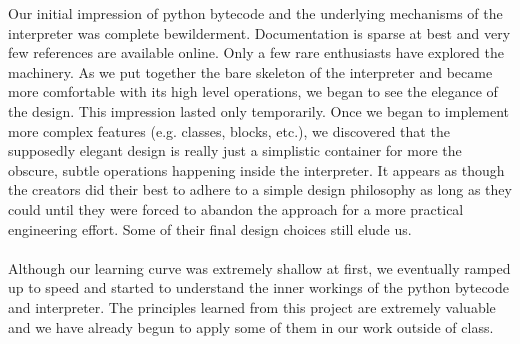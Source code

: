 \documentclass{article}
\begin{document}
Our initial impression of python bytecode and the underlying mechanisms of the interpreter was complete bewilderment.  Documentation is sparse at best and very few references are available online.  Only a few rare enthusiasts have explored the machinery.  As we put together the bare skeleton of the interpreter and became more comfortable with its high level operations, we began to see the elegance of the design.  This impression lasted only temporarily.  Once we began to implement more complex features (e.g. classes, blocks, etc.), we discovered that the supposedly elegant design is really just a simplistic container for more the obscure, subtle operations happening inside the interpreter.  It appears as though the creators did their best to adhere to a simple design philosophy as long as they could until they were forced to abandon the approach for a more practical engineering effort.  Some of their final design choices still elude us.\\
\\
 Although our learning curve was extremely shallow at first, we eventually ramped up to speed and started to understand the inner workings of the python bytecode and interpreter.  The principles learned from this project are extremely valuable and we have already begun to apply some of them in our work outside of class.
\end{document}
